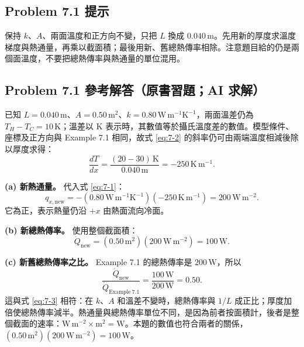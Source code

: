 \subsection*{Problem 7.1 提示}
保持 \(k\)、\(A\)、兩面溫度和正方向不變，只把 \(L\) 換成 \(0.040\,\mathrm m\)。先用新的厚度求溫度梯度與熱通量，再乘以截面積；最後用新、舊總熱傳率相除。注意題目給的仍是兩個面溫度，不要把總熱傳率與熱通量的單位混用。

\subsection*{Problem 7.1 參考解答（原書習題；AI 求解）}

已知 \(L=0.040\,\mathrm m\)、\(A=0.50\,\mathrm{m^2}\)、\(k=0.80\,\mathrm{W\,m^{-1}K^{-1}}\)，兩面溫差仍為 \(T_H-T_C=10\,\mathrm K\)；溫差以 K 表示時，其數值等於攝氏溫度差的數值。模型條件、座標及正方向與 Example 7.1 相同，故式 \eqref{eq:7-2} 的斜率仍可由兩端溫度相減後除以厚度求得：
\[
\frac{dT}{dx}=\frac{(20-30)\,\mathrm K}{0.040\,\mathrm m}
=-250\,\mathrm{K\,m^{-1}}.
\]

\textbf{(a) 新熱通量。} 代入式 \eqref{eq:7-1}：
\[
q_{x,\mathrm{new}}
=-(0.80\,\mathrm{W\,m^{-1}K^{-1}})
(-250\,\mathrm{K\,m^{-1}})
=200\,\mathrm{W\,m^{-2}}.
\]
它為正，表示熱量仍沿 \(+x\) 由熱面流向冷面。

\textbf{(b) 新總熱傳率。} 使用整個截面積：
\[
\dot Q_{\mathrm{new}}
=(0.50\,\mathrm{m^2})(200\,\mathrm{W\,m^{-2}})
=100\,\mathrm W.
\]

\textbf{(c) 新舊總熱傳率之比。} Example 7.1 的總熱傳率是 \(200\,\mathrm W\)，所以
\[
\frac{\dot Q_{\mathrm{new}}}{\dot Q_{\mathrm{Example\ 7.1}}}
=\frac{100\,\mathrm W}{200\,\mathrm W}=0.50.
\]
這與式 \eqref{eq:7-3} 相符：在 \(k\)、\(A\) 和溫差不變時，總熱傳率與 \(1/L\) 成正比；厚度加倍使總熱傳率減半。熱通量與總熱傳率單位不同，是因為前者按面積計，後者是整個截面的速率：\(\mathrm{W\,m^{-2}}\times\mathrm{m^2}=\mathrm W\)。本題的數值也符合兩者的關係，\((0.50\,\mathrm{m^2})(200\,\mathrm{W\,m^{-2}})=100\,\mathrm W\)。